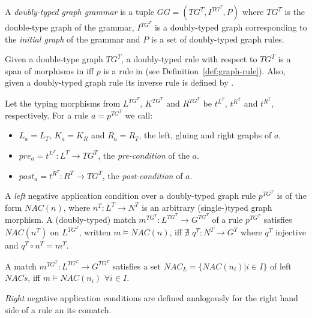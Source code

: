 \begin{definition} A \emph{doubly-typed graph grammar} is a tuple $GG = \left(TG^T, I^{TG^T},P \right)$ where $TG^T$ is the double-type graph of the grammar, $I^{TG^T}$ is a doubly-typed graph corresponding to the \emph{initial graph} of the grammar and $P$ is a set of doubly-typed graph rules. 
\end{definition}

\begin{definition} Given a double-type graph $TG^T$, a doubly-typed rule with respect to $TG^T$ is a span of morphisms \doublyTypedRule{} in \doublyTypedGraphCategory{} iff $p$ is a rule in \typedGraphCategory{} (see Definition~\ref{def:graph-rule}). Also, given a doubly-typed graph rule \doublyTypedRule{} its inverse rule is defined by \inverseDoublyTypedRule{}.

  Let the typing morphisms from $L^{TG^T}$, $K^{TG^T}$ and $R^{TG^T}$ be $t^{L^T}$, $t^{K^T}$ and $t^{R^T}$, respectively. For a rule $a = p^{TG^T}$ we call:

  \begin{itemize}
    \item $L_a = L_T$, $K_a = K_R$ and $R_a = R_T$, the left, gluing and right graphs of $a$.
    \item $pre_a = t^{L^T} : L^T \rightarrow TG^T$, the \emph{pre-condition} of the $a$.
    \item $post_a = t^{R^T} : R^T \rightarrow TG^T$, the \emph{post-condition} of $a$.
  \end{itemize}
\end{definition}

\begin{definition} A \emph{left} negative application condition over a doubly-typed graph rule $p^{TG^T}$ is of the form $NAC(n)$, where $n^T : L^T \rightarrow N^T$ is an arbitrary (single-)typed graph morphism. A  (doubly-typed) match $m^{TG^T} : L^{TG^T} \rightarrow G^{TG^T}$ of a rule $p^{TG^T}$ satisfies $NAC(n^T)$ on $L^{TG^T}$, written \mbox{$m \models NAC(n)$}, iff $\nexists$ $q^T : N^T \rightarrow G^T$ where $q^T$ injective and $q^T \circ n^T = m^T$.


  A match $m^{TG^T} : L^{TG^T} \rightarrow G^{TG^T}$ satisfies a set \mbox{$NAC_L = \{NAC\left(n_i\right)|i \in I\}$} of left $NACs$, iff \mbox{$m \models NAC\left(n_i\right)$} $\forall i \in I$.

\emph{Right} negative application conditions are defined analogously for the right hand side of a rule an its comatch.


\end{definition}

